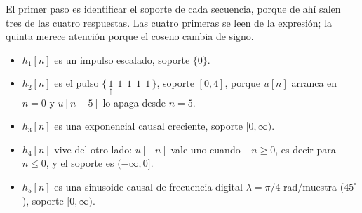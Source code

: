 \documentclass[10pt,a4paper]{article}
\begin{document}
	El primer paso es identificar el soporte de cada secuencia, porque de ahí salen tres de
	las cuatro respuestas. Las cuatro primeras se leen de la expresión; la quinta merece
	atención porque el coseno cambia de signo.

	\begin{itemize}[nosep]
		\item $h_1[n]$ es un impulso escalado, soporte $\{0\}$.
		\item $h_2[n]$ es el pulso $\{\,\underset{\uparrow}{1}\ \ 1\ \ 1\ \ 1\ \ 1\,\}$,
		      soporte $[0,4]$, porque $u[n]$ arranca en $n=0$ y $u[n-5]$ lo apaga desde
		      $n=5$.
		\item $h_3[n]$ es una exponencial causal creciente, soporte $[0,\infty)$.
		\item $h_4[n]$ vive del otro lado: $u[-n]$ vale uno cuando $-n\ge 0$, es decir para
		      $n\le 0$, y el soporte es $(-\infty,0]$.
		\item $h_5[n]$ es una sinusoide causal de frecuencia digital $\lambda=\pi/4$
		      rad/muestra ($45^\circ$), soporte $[0,\infty)$.
	\end{itemize}
\end{document}
